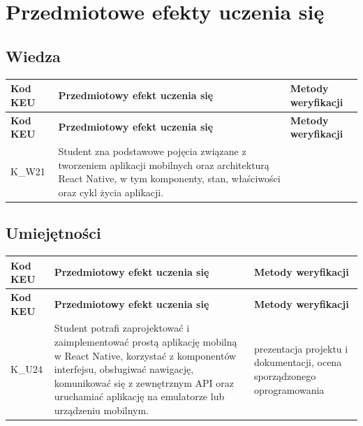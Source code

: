 \documentclass[12pt, a4paper]{article}
\newcommand{\thdrule}{\noalign{\global\setlength{\extrarowheight}{0pt}}}
\newcommand{\thdend}{\noalign{\global\setlength{\extrarowheight}{3pt}}}
\begin{document}
\section{Przedmiotowe efekty uczenia się}

\subsection*{Wiedza}
{\scriptsize
\begin{longtable}{m{1.6cm}m{9.0cm}m{4.2cm}}
\thdrule\toprule
\rowcolor{pjatkRed} {\color{white}\footnotesize\textbf{\vphantom{Ag}Kod KEU}} & {\color{white}\footnotesize\textbf{\vphantom{Ag}Przedmiotowy efekt uczenia się}} & {\color{white}\footnotesize\textbf{\vphantom{Ag}Metody weryfikacji}} \\
\midrule\thdend
\endfirsthead
\thdrule\toprule
\rowcolor{pjatkRed} {\color{white}\footnotesize\textbf{\vphantom{Ag}Kod KEU}} & {\color{white}\footnotesize\textbf{\vphantom{Ag}Przedmiotowy efekt uczenia się}} & {\color{white}\footnotesize\textbf{\vphantom{Ag}Metody weryfikacji}} \\
\midrule\thdend
\endhead
  \rowcolor{tableRowLight} K\_W21 & Student zna podstawowe pojęcia związane z tworzeniem aplikacji mobilnych oraz architekturą React Native, w tym komponenty, stan, właściwości oraz cykl życia aplikacji. &  \\
\bottomrule
\end{longtable}}

\subsection*{Umiejętności}
{\scriptsize
\begin{longtable}{m{1.6cm}m{9.0cm}m{4.2cm}}
\thdrule\toprule
\rowcolor{pjatkRed} {\color{white}\footnotesize\textbf{\vphantom{Ag}Kod KEU}} & {\color{white}\footnotesize\textbf{\vphantom{Ag}Przedmiotowy efekt uczenia się}} & {\color{white}\footnotesize\textbf{\vphantom{Ag}Metody weryfikacji}} \\
\midrule\thdend
\endfirsthead
\thdrule\toprule
\rowcolor{pjatkRed} {\color{white}\footnotesize\textbf{\vphantom{Ag}Kod KEU}} & {\color{white}\footnotesize\textbf{\vphantom{Ag}Przedmiotowy efekt uczenia się}} & {\color{white}\footnotesize\textbf{\vphantom{Ag}Metody weryfikacji}} \\
\midrule\thdend
\endhead
  \rowcolor{tableRowLight} K\_U24 & Student potrafi zaprojektować i zaimplementować prostą aplikację mobilną w React Native, korzystać z komponentów interfejsu, obsługiwać nawigację, komunikować się z zewnętrznym API oraz uruchamiać aplikację na emulatorze lub urządzeniu mobilnym. & prezentacja projektu i dokumentacji, ocena sporządzonego oprogramowania \\
\bottomrule
\end{longtable}}
\end{document}
